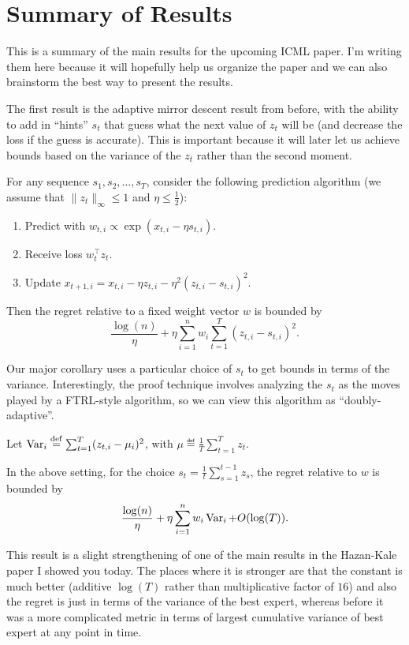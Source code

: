\documentclass[11pt]{article}
\begin{document}
\section{Summary of Results}
This is a summary of the main results for the upcoming ICML paper. I'm writing them here because it 
will hopefully help us organize the paper and we can also brainstorm the best way to present the results.

The first result is the adaptive mirror descent result from before, with the ability to add in 
``hints'' $s_t$ that guess what the next value of $z_t$ will be (and decrease the loss if the guess is 
accurate). This is important because it will later let us achieve bounds based on the variance of the $z_t$ 
rather than the second moment.
\begin{theorem}
For any sequence $s_1, s_2, \ldots, s_T$, consider the following prediction algorithm (we assume 
that $\|z_t\|_{\infty} \leq 1$ and $\eta \leq \frac{1}{2}$):
\begin{enumerate}
\item Predict with $w_{t,i} \propto \exp(x_{t,i} - \eta s_{t,i})$.
\item Receive loss $w_t^{\top}z_t$.
\item Update $x_{t+1,i} = x_{t,i} - \eta z_{t,i} - \eta^2 (z_{t,i} - s_{t,i})^2$.
\end{enumerate}
Then the regret relative to a fixed weight vector $w$ is bounded by
\[ \frac{\log(n)}{\eta} + \eta \sum_{i=1}^n w_i \sum_{t=1}^T (z_{t,i}-s_{t,i})^2. \]
\end{theorem}

Our major corollary uses a particular choice of $s_t$ to get bounds in terms of the variance. Interestingly, 
the proof technique involves analyzing the $s_t$ as the moves played by a FTRL-style algorithm, so we can 
view this algorithm as ``doubly-adaptive''.

Let $\operatorname{Var}_i \stackrel{\mathrm{def}}{=} \sum_{t=1}^T (z_{t,i}-\mu_i)^2$, with $\mu \eqdef \frac{1}{T} \sum_{t=1}^T z_t$.
\begin{corollary}
In the above setting, for the choice $s_t = \frac{1}{t} \sum_{s=1}^{t-1} z_s$, the 
regret relative to $w$ is bounded by
\[ \frac{\log(n)}{\eta} + \eta \sum_{i=1}^n w_i\operatorname{Var}_i + O(\log(T)). \]
\end{corollary}
This result is a slight strengthening of one of the main results in the Hazan-Kale paper I showed you today. 
The places where it is stronger are that the constant is much better (additive $\log(T)$ rather than 
multiplicative factor of $16$) and also the regret is just in terms of the variance of the best expert, 
whereas before it was a more complicated metric in terms of largest cumulative variance of best expert 
at any point in time.
\end{document}

